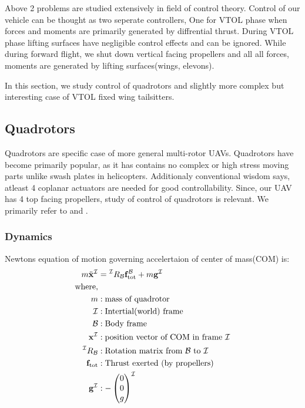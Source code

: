 Above 2 problems are studied extensively in field of control theory. Control of our vehicle can be thought as two seperate controllers, One for VTOL phase when forces and moments are primarily generated by diffrential thrust. During VTOL phase lifting surfaces have negligible control effects and can be ignored. While during forward flight, we shut down vertical facing propellers and all all forces, moments are generated by lifting surfaces(wings, elevons).

In this section, we study control of quadrotors and slightly more complex but interesting case of VTOL fixed wing tailsitters.

\subsection{Quadrotors}
Quadrotors are specific case of more general multi-rotor UAVs. Quadrotors have become primarily popular, as it has contains no complex or high stress moving parts unlike swash plates in helicopters. Additionaly conventional wisdom says, atleast 4 coplanar actuators are needed for good controllability. Since, our UAV has 4 top facing propellers, study of control of quadrotors is relevant. We primarily refer to \cite{mellinger2011minimum} and \cite{lee2010geometric}.

\subsubsection{Dynamics}

Newtons equation of motion governing accelertaion of center of mass(COM) is:
\begin{align*}
    m\ddot{\mathbf{x}}^\mathcal{I} &= \prescript{\mathcal{I}}{}R_{\mathcal{B}} \mathbf{f}^{\mathcal{B}}_{\text{tot}} + m\mathbf{g}^{\mathcal{I}} \\
    \text{where,}\\
    m&: \text{mass of quadrotor}\\
    \mathcal{I} &: \text{Intertial(world) frame}\\
    \mathcal{B} &: \text{Body frame}\\
    \mathbf{x}^\mathcal{I}&: \text{position vector of COM in frame } \mathcal{I}\\
    \prescript{\mathcal{I}}{}R_{\mathcal{B}}&: \text{Rotation matrix from }\mathcal{B} \text{ to }\mathcal{I}\\
    \mathbf{f}_{\text{tot}}&: \text{Thrust exerted (by propellers)}\\
    \mathbf{g}^{\mathcal{I}}&: -\begin{pmatrix}0\\0\\g\end{pmatrix}^\mathcal{I}
\end{align*}

